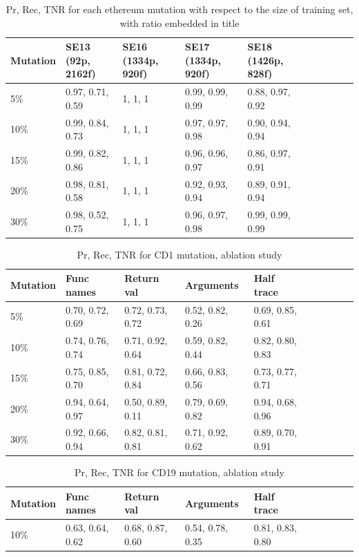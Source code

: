 \begin{table}[]
\centering
\small
\begin{tabular}{|l|l|l|l|l|l|l@{\hskip 5mm}|l|l|l|}
	\hline
	Mutation & SE13 (92p, 2162f) & SE16 (1334p, 920f) & SE17 (1334p, 920f) & SE18 (1426p, 828f) \\ 
	\hline
	5\% & 0.97, 0.71, 0.59 & 1, 1, 1 & 0.99, 0.99, 0.99 & 0.88, 0.97, 0.92 \\ \hline
	10\% & 0.99, 0.84, 0.73 & 1, 1, 1 & 0.97, 0.97, 0.98 & 0.90, 0.94, 0.94 \\ \hline
	15\% & 0.99, 0.82, 0.86 & 1, 1, 1 & 0.96, 0.96, 0.97 & 0.86, 0.97, 0.91 \\ \hline
	20\% & 0.98, 0.81, 0.58 & 1, 1, 1 & 0.92, 0.93, 0.94 & 0.89, 0.91, 0.94 \\ \hline
	30\% & 0.98, 0.52, 0.75 & 1, 1, 1 & 0.96, 0.97, 0.98 & 0.99, 0.99, 0.99 \\ \hline
\end{tabular}
\caption{Pr, Rec, TNR for each ethereum mutation with respect to the size of training set, with ratio embedded in title}
\vspace{-20pt}
\label{tab:eth-2}
\end{table}


\begin{table}[]
\centering
\small
\begin{tabular}{|l|l|l|l|l|l|l@{\hskip 5mm}|l|l|l|}
	\hline
	Mutation & Func names & Return val & Arguments & Half trace \\ 
	\hline
	5\% & 0.70, 0.72, 0.69 & 0.72, 0.73, 0.72 & 0.52, 0.82, 0.26 & 0.69, 0.85, 0.61 \\ \hline
	10\% & 0.74, 0.76, 0.74 & 0.71, 0.92, 0.64 & 0.59, 0.82, 0.44 & 0.82, 0.80, 0.83 \\ \hline
	15\% & 0.75, 0.85, 0.70 & 0.81, 0.72, 0.84 & 0.66, 0.83, 0.56 & 0.73, 0.77, 0.71 \\ \hline
	20\% & 0.94, 0.64, 0.97 & 0.50, 0.89, 0.11 & 0.79, 0.69, 0.82 & 0.94, 0.68, 0.96 \\ \hline
	30\% & 0.92, 0.66, 0.94 & 0.82, 0.81, 0.81 & 0.71, 0.92, 0.62 & 0.89, 0.70, 0.91 \\ \hline
\end{tabular}
\caption{Pr, Rec, TNR for CD1 mutation, ablation study}
\vspace{-20pt}
\label{tab:eth-3}
\end{table}


\begin{table}[]
\centering
\small
\begin{tabular}{|l|l|l|l|l|l|l@{\hskip 5mm}|l|l|l|}
	\hline
	Mutation & Func names & Return val & Arguments & Half trace \\ 
	\hline
	10\% & 0.63, 0.64, 0.62 & 0.68, 0.87, 0.60 & 0.54, 0.78, 0.35 & 0.81, 0.83, 0.80 \\ \hline
\end{tabular}
\caption{Pr, Rec, TNR for CD19 mutation, ablation study}
\vspace{-20pt}
\label{tab:eth-4}
\end{table}

